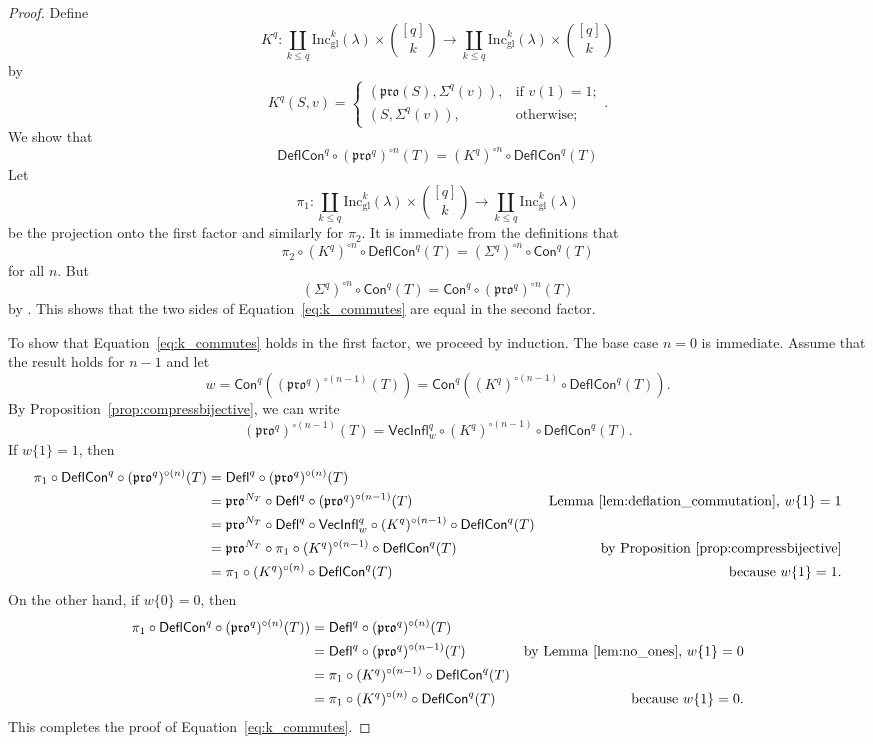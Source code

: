 \documentclass[12pt]{amsart}
\theoremstyle{definition}
\theoremstyle{remark}
\numberwithin{equation}{section}
\newcommand{\inc}{\ensuremath{\mathrm{Inc}}}
\newcommand{\incgl}{\inc_{\mathrm{gl}}}
\newcommand{\pro}{\mathfrak{pro}}
\newcommand{\deflate}{\ensuremath{\mathsf{Defl}}}
\newcommand{\inflate}{\ensuremath{\mathsf{VecInfl}}}
\newcommand{\content}{\ensuremath{\mathsf{Con}}}
\newcommand{\compress}{\ensuremath{\mathsf{DeflCon}}}
\begin{document}
  \begin{proof}
Define
  \[
  K^q: \coprod_{k \leq q}\incgl^k(\lambda) \times \binom{[q]}{k} \rightarrow \coprod_{k \leq q}\incgl^k(\lambda) \times \binom{[q]}{k}
  \] by
\[
K^q(S,v) =
\begin{cases}
    (\pro(S),\Sigma^q(v)),  & \text{if } v(1) = 1; \\        
   (S,\Sigma^q(v)), & \text{otherwise;}
\end{cases}.
\]
We show that 
\begin{equation}\label{eq:k_commutes}
\compress^q \circ (\pro^q)^{\circ n}(T) = (K^q)^{\circ n} \circ \compress^q(T)
\end{equation}
Let \[ \pi_1: \coprod_{k \leq q}\incgl^k(\lambda) \times \binom{[q]}{k} \rightarrow \coprod_{k \leq q} \incgl^k(\lambda) \] be the projection onto the first factor and similarly for $\pi_2$. It is immediate from the definitions that \[ \pi_2 \circ (K^q)^{\circ n} \circ \compress^q(T) = (\Sigma^q)^{\circ n} \circ \content^q(T)\] for all $n$. But
\[  (\Sigma^q)^{\circ n} \circ \content^q(T) = \content^q \circ (\pro^q)^{\circ n} (T) \] by  \cite[Lemma~2.1]{DPS}. This shows that the two sides of Equation~\ref{eq:k_commutes} are equal in the second factor.  

To show that Equation~\ref{eq:k_commutes} holds in the first factor, we proceed by induction. The base case $n = 0$ is immediate. Assume that the result holds for $n-1$ and let \[ w = \content^q((\pro^q)^{\circ (n-1)}(T)) = \content^q((K^q)^{\circ (n-1)} \circ \compress^q(T)). \]  By Proposition~\ref{prop:compressbijective}, we can write
\[ (\pro^q)^{\circ (n-1)}(T) = \inflate^q_{w} \circ (K^q)^{\circ (n-1)} \circ \compress^q(T).\] 
If $w\lbrace 1 \rbrace = 1 $, then
\begin{align*}
\pi_1 \circ \compress^q \circ (\pro^q)^{\circ (n)}(T) &= \deflate^q \circ (\pro^q)^{\circ (n)}(T) \\
&= \pro^{N_T} \circ \deflate^q \circ (\pro^q)^{\circ (n-1)}(T) &\text{Lemma~\ref{lem:deflation_commutation}, $w\lbrace 1 \rbrace = 1$} \\
&= \pro^{N_T} \circ \deflate^q \circ \inflate^q_{w} \circ (K^q)^{\circ (n-1)} \circ \compress^q(T)  \\
&= \pro^{N_T} \circ \pi_1 \circ (K^q)^{\circ (n-1)} \circ \compress^q(T) &\text{by Proposition~\ref{prop:compressbijective}} \\ 
&= \pi_1 \circ (K^q)^{\circ (n)} \circ \compress^q(T) &\text{because $w\lbrace 1 \rbrace = 1$.}
\end{align*}
On the other hand, if $w \lbrace 0 \rbrace = 0$, then 
\begin{align*}
\pi_1 \circ \compress^q \circ (\pro^q)^{\circ (n)}(T)) &= \deflate^q \circ (\pro^q)^{\circ (n)}(T) \\
&= \deflate^q \circ (\pro^q)^{\circ (n-1)}(T) &\text{by Lemma~\ref{lem:no_ones}, $w \lbrace 1 \rbrace = 0$} \\
&= \pi_1  \circ (K^q)^{\circ (n-1)} \circ \compress^q(T)  \\
&= \pi_1 \circ (K^q)^{\circ (n)} \circ \compress^q(T) &\text{because $w\lbrace 1 \rbrace = 0$.}
\end{align*}
This completes the proof of Equation~\ref{eq:k_commutes}.


\end{proof}
\end{document}
